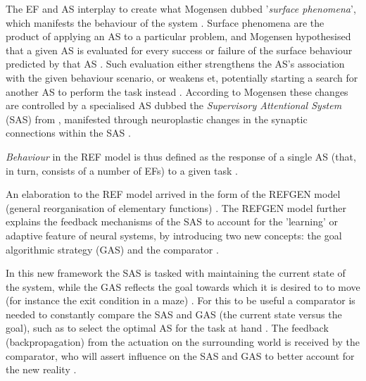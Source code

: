 \documentclass[a4paper,oneside]{memoir}
\begin{document}
The EF and AS interplay to create what Mogensen dubbed '\textit{surface
phenomena}', which manifests the behaviour of the system \autocite{Mogensen2011}.
Surface phenomena are the product of applying an AS to a particular problem,
and Mogensen hypothesised that a given AS is evaluated for every success or
failure of the surface behaviour predicted by that AS \autocite{Mogensen2011}.
Such evaluation either strengthens the AS's association with the given
behaviour scenario, or weakens et, potentially starting a search for another
AS to perform the task instead \autocite{Mogensen2011}.
According to Mogensen these changes are controlled by a specialised AS dubbed
the \textit{Supervisory Attentional System} (SAS) from \autocite{Norman1986},
manifested through neuroplastic changes in the synaptic connections within
the SAS \autocite{Mogensen2011}.

\textit{Behaviour} in the REF model is thus defined as the response of a single
AS (that, in turn, consists of a number of EFs) to a given task
\autocite{Mogensen2011, Mogensen2012b}.


An elaboration to the REF model arrived in the form of the REFGEN
model (general reorganisation of elementary functions) \autocite{Mogensen2017}.
The REFGEN model further explains the feedback mechanisms of the SAS
to account for the 'learning' or adaptive feature of neural systems, by
introducing two new concepts: the goal algorithmic strategy (GAS) and the
comparator \autocite{Mogensen2017, Mogensen2012b}.

In this new framework the SAS is tasked with maintaining the current state
of the system, while the GAS reflects the goal towards which it is desired to
to move (for instance the exit condition in a maze) \autocite{Mogensen2017}.
For this to be useful a comparator is needed to constantly compare the SAS
and GAS (the current state versus the goal), such as to select the optimal AS
for the task at hand \autocite{Mogensen2017}. The feedback (backpropagation)
from the actuation on the surrounding world is received by the comparator,
who will assert influence on the SAS and GAS to better account for the new
reality \autocite{Mogensen2017}.
\end{document}
